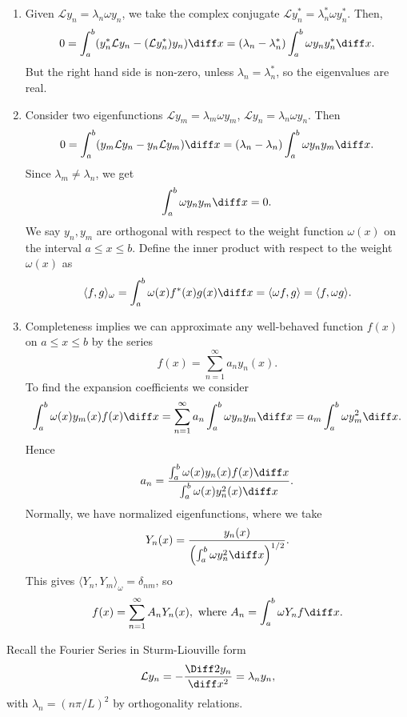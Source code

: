 \documentclass[12pt]{article}
\begin{document}
\begin{proofbox}
\begin{enumerate}[1.]
	\item Given $\mathcal{L}y_n = \lambda_n \omega y_n$, we take the complex conjugate $\mathcal{L}y_n^{\ast} = \lambda_n^{\ast} \omega y_n^{\ast}$. Then,
		\[
			0 = \int_{a}^{b} (y_n^{\ast} \mathcal{L}y_n - (\mathcal{L}y_n^{\ast}) y_n)\diff x = (\lambda_n - \lambda_n^{\ast}) \int_{a}^{b} \omega y_n y_n^{\ast}\diff x
		.\]
		But the right hand side is non-zero, unless $\lambda_n = \lambda_n^{\ast}$, so the eigenvalues are real.
	\item Consider two eigenfunctions $\mathcal{L}y_m = \lambda_m \omega y_m$, $\mathcal{L}y_n = \lambda_n \omega y_n$. Then
		\[
			0 = \int_{a}^{b}(y_m \mathcal{L}y_n - y_n \mathcal{L}y_m) \diff x = (\lambda_n - \lambda_n) \int_{a}^{b} \omega y_n y_m \diff x
		.\]
		Since $\lambda_m \neq \lambda_n$, we get
		\[
		\int_{a}^{b} \omega y_n y_m \diff x = 0
		.\]
		We say $y_n, y_m$ are orthogonal with respect to the weight function $\omega(x)$ on the interval $a \leq x \leq b$. Define the inner product with respect to the weight $\omega(x)$ as
		\[
			\langle f, g \rangle_{\omega} = \int_{a}^{b} \omega(x) f^{\ast}(x) g(x) \diff x = \langle \omega f, g \rangle = \langle f, \omega g\rangle
		.\]
	\item Completeness implies we can approximate any well-behaved function $f(x)$ on $a \leq x \leq b$ by the series
		\[
			f(x) = \sum_{n = 1}^{\infty} a_n y_n(x)
		.\]
	To find the expansion coefficients we consider
		\[
			\int_{a}^{b} \omega(x) y_m(x) f(x) \diff x = \sum_{n = 1}^{\infty} a_n \int_{a}^{b} \omega y_n y_m \diff x = a_m \int_{a}^{b} \omega y_m^2\diff x
		.\]
		Hence
		\[
			a_n = \frac{\int_{a}^{b} \omega(x) y_n(x) f(x) \diff x}{\int_{a}^{b}\omega(x) y_n^2(x)\diff x}
		.\]
		Normally, we have normalized eigenfunctions, where we take
		\[
			Y_n(x) = \frac{y_n(x)}{\left( \int_{a}^{b}\omega y_n^2 \diff x \right)^{1/2}}
		.\]
		This gives $\langle Y_n, Y_m \rangle_{\omega} = \delta_{nm}$, so
		\[
			f(x) = \sum_{n = 1}^{\infty} A_n Y_n(x)
		, \text{ where }
		A_n = \int_{a}^{b} \omega Y_n f \diff x
		.\]
\end{enumerate}
\end{proofbox}

\begin{exbox}
	Recall the Fourier Series in Sturm-Liouville form
	\[
	\mathcal{L}y_n = -\frac{\Diff2 y_n}{\diff x^2} = \lambda_n y_n
	,\]
	with $\lambda_n = (n\pi/L)^2$ by orthogonality relations.
\end{exbox}
\end{document}
